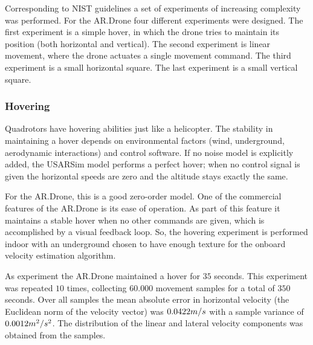 Corresponding to NIST guidelines \cite{Jacoff2010STM}
a set of experiments of increasing complexity was performed. For the AR.Drone
four different experiments were designed.
The first experiment is a simple hover, in which the drone tries to maintain its position (both horizontal and vertical). The second experiment is linear movement, where the drone actuates a single movement command. The third experiment is a small horizontal square. The last experiment is a small vertical square.

\subsubsection{Hovering}

Quadrotors have hovering abilities just like a helicopter. The stability in maintaining a hover depends
on environmental factors (wind, underground, aerodynamic interactions) and control software.
If no noise model is explicitly added, the USARSim model performs a perfect hover; when no control signal is given the
horizontal speeds are zero and the altitude stays exactly the same.

For the AR.Drone, this is a good zero-order model. One of the commercial features of the AR.Drone is its ease of operation. As part of this feature it
maintains a stable hover when no other commands are given, which is accomplished by a visual feedback loop.
So, the hovering experiment is performed  
indoor
with an underground chosen to have enough texture for the onboard velocity estimation algorithm.

As experiment the AR.Drone maintained a hover for $35$ seconds. This experiment was repeated $10$ times,
collecting $60.000$ movement samples for a total of $350$ seconds. Over all samples the mean absolute error in horizontal
velocity (the Euclidean norm of the velocity vector) was $0.0422\small{m/s}$ with a sample variance of $0.0012\small{m^2/s^2}$. The distribution of the linear and lateral velocity components was obtained from the samples.


